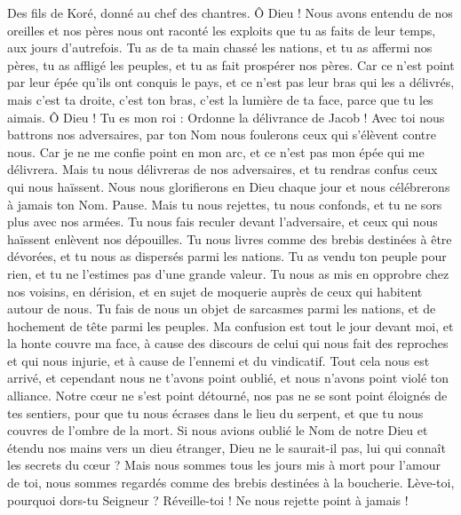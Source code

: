 \begin{multicols}{2}
\VerseOne{}Des fils de Koré, donné au chef des chantres.
Ô Dieu ! Nous avons entendu de nos oreilles et nos pères nous ont raconté les exploits que tu as faits de leur temps, aux jours d'autrefois.
Tu as de ta main chassé les nations, et tu as affermi nos pères, tu as affligé les peuples, et tu as fait prospérer nos pères.
Car ce n'est point par leur épée qu'ils ont conquis le pays, et ce n'est pas leur bras qui les a délivrés, mais c’est ta droite, c’est ton bras, c’est la lumière de ta face, parce que tu les aimais.
Ô Dieu ! Tu es mon roi : Ordonne la délivrance de Jacob !
Avec toi nous battrons nos adversaires, par ton Nom nous foulerons ceux qui s'élèvent contre nous.
Car je ne me confie point en mon arc, et ce n’est pas mon épée qui me délivrera.
Mais tu nous délivreras de nos adversaires, et tu rendras confus ceux qui nous haïssent.
Nous nous glorifierons en Dieu chaque jour et nous célébrerons à jamais ton Nom. Pause.
Mais tu nous rejettes, tu nous confonds, et tu ne sors plus avec nos armées.
Tu nous fais reculer devant l'adversaire, et ceux qui nous haïssent enlèvent nos dépouilles.
Tu nous livres comme des brebis destinées à être dévorées, et tu nous as dispersés parmi les nations.
Tu as vendu ton peuple pour rien, et tu ne l’estimes pas d’une grande valeur.
Tu nous as mis en opprobre chez nos voisins, en dérision, et en sujet de moquerie auprès de ceux qui habitent autour de nous.
Tu fais de nous un objet de sarcasmes parmi les nations, et de hochement de tête parmi les peuples.
Ma confusion est tout le jour devant moi, et la honte couvre ma face,
à cause des discours de celui qui nous fait des reproches et qui nous injurie, et à cause de l'ennemi et du vindicatif.
Tout cela nous est arrivé, et cependant nous ne t'avons point oublié, et nous n'avons point violé ton alliance.
Notre cœur ne s’est point détourné, nos pas ne se sont point éloignés de tes sentiers,
pour que tu nous écrases dans le lieu du serpent, et que tu nous couvres de l'ombre de la mort.
Si nous avions oublié le Nom de notre Dieu et étendu nos mains vers un dieu étranger,
Dieu ne le saurait-il pas, lui qui connaît les secrets du cœur ?
Mais nous sommes tous les jours mis à mort pour l'amour de toi, nous sommes regardés comme des brebis destinées à la boucherie.
Lève-toi, pourquoi dors-tu Seigneur ? Réveille-toi ! Ne nous rejette point à jamais !

\end{multicols}
